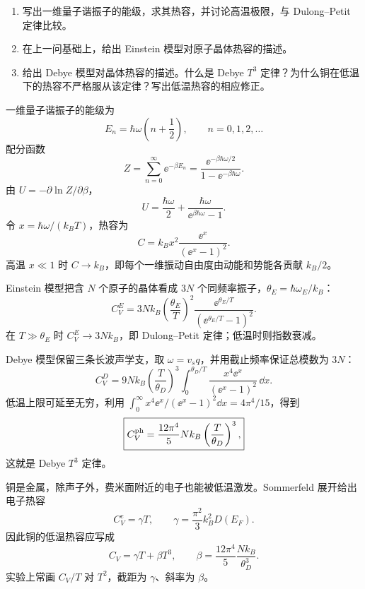 
\begin{question}
\begin{enumerate}
  \item 写出一维量子谐振子的能级，求其热容，并讨论高温极限，与 Dulong--Petit 定律比较。
  \item 在上一问基础上，给出 Einstein 模型对原子晶体热容的描述。
  \item 给出 Debye 模型对晶体热容的描述。什么是 Debye $T^3$ 定律？为什么铜在低温下的热容不严格服从该定律？写出低温热容的相应修正。
\end{enumerate}


\begin{solution}
一维量子谐振子的能级为
\[
 \boxed{E_n=\hbar\omega\left(n+\frac12\right),\qquad n=0,1,2,\ldots}
\]
配分函数
\[
 Z=\sum_{n=0}^\infty\ee^{-\beta E_n}
 =\frac{\ee^{-\beta\hbar\omega/2}}{1-\ee^{-\beta\hbar\omega}}.
\]
由 $U=-\partial\ln Z/\partial\beta$，
\[
 U=\frac{\hbar\omega}{2}+
 \frac{\hbar\omega}{\ee^{\beta\hbar\omega}-1}.
\]
令 $x=\hbar\omega/(k_BT)$，热容为
\[
 \boxed{C=k_Bx^2\frac{\ee^x}{(\ee^x-1)^2}.}
\]
高温 $x\ll1$ 时 $C\to k_B$，即每个一维振动自由度由动能和势能各贡献 $k_B/2$。

Einstein 模型把含 $N$ 个原子的晶体看成 $3N$ 个同频率振子，$\theta_E=\hbar\omega_E/k_B$：
\[
 \boxed{C_V^E=3Nk_B\left(\frac{\theta_E}{T}\right)^2
 \frac{\ee^{\theta_E/T}}{(\ee^{\theta_E/T}-1)^2}.}
\]
在 $T\gg\theta_E$ 时
$C_V^E\to3Nk_B$，即 Dulong--Petit 定律；低温时则指数衰减。

Debye 模型保留三条长波声学支，取 $\omega=v_sq$，并用截止频率保证总模数为 $3N$：
\[
 \boxed{C_V^D=9Nk_B\left(\frac{T}{\theta_D}\right)^3
 \int_0^{\theta_D/T}\frac{x^4\ee^x}{(\ee^x-1)^2}\,\dd x.}
\]
低温上限可延至无穷，利用
$\int_0^\infty x^4\ee^x/(\ee^x-1)^2\dd x=4\pi^4/15$，得到
\[
 \boxed{C_V^{\rm ph}=\frac{12\pi^4}{5}Nk_B
 \left(\frac{T}{\theta_D}\right)^3,}
\]
这就是 Debye $T^3$ 定律。

铜是金属，除声子外，费米面附近的电子也能被低温激发。Sommerfeld 展开给出电子热容
\[
 C_V^e=\gamma T,
 \qquad
 \gamma=\frac{\pi^2}{3}k_B^2D(E_F).
\]
因此铜的低温热容应写成
\[
 \boxed{C_V=\gamma T+\beta T^3,\qquad
 \beta=\frac{12\pi^4}{5}\frac{Nk_B}{\theta_D^3}.}
\]
实验上常画 $C_V/T$ 对 $T^2$，截距为 $\gamma$、斜率为 $\beta$。
\end{solution}
\end{question}


